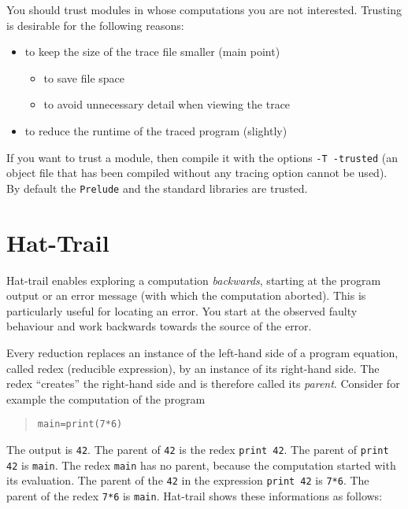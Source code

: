 \documentclass[12pt]{article}
\newenvironment{code}{\begin{quote}\begin{alltt}}{\end{alltt}\end{quote}}
\begin{document}
You should trust modules in whose computations you are not interested.
Trusting is desirable for the following reasons:
\begin{itemize}
\item to keep the size of the trace file smaller (main point)
\begin{itemize}
\item to save file space
\item to avoid unnecessary detail when viewing the trace
\end{itemize}
\item to reduce the runtime of the traced program (slightly)
\end{itemize}

If you want to trust a module, then compile it with the options
\texttt{-T -trusted} (an object file that has been compiled without any tracing option cannot be used). By default the \texttt{Prelude} and the standard libraries are trusted. 




\section{Hat-Trail}


Hat-trail enables exploring a computation \emph{backwards}, starting at the program output or an error message (with which the computation aborted). This is particularly useful for locating an error. You start at the observed faulty behaviour and work backwards towards the source of the error. 

Every reduction replaces an instance of the left-hand side of a program equation, called redex (reducible expression), by an instance of its right-hand side. The redex ``creates'' the right-hand side and is therefore called its \emph{parent}. Consider for example the computation of the program
\begin{code}
main = print (7*6)
\end{code}
The output is \texttt{42}. The parent of \texttt{42} is the redex \texttt{print 42}. The parent of \texttt{print 42} is \texttt{main}. The redex \texttt{main} has no parent, because the computation started with its evaluation. The parent of the \texttt{42} in the expression \texttt{print 42} is \texttt{7*6}. The parent of the redex \texttt{7*6} is \texttt{main}. Hat-trail shows these informations as follows:
\end{document}
